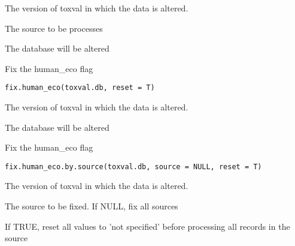 \documentclass[letterpaper]{book}
\begin{document}
%
\begin{Arguments}
\begin{ldescription}
\item[\code{toxval.db}] The version of toxval in which the data is altered.

\item[\code{source}] The source to be processes
\end{ldescription}
\end{Arguments}
%
\begin{Value}
The database will be altered
\end{Value}
%
\begin{Description}\relax
Fix the human\_eco flag
\end{Description}
%
\begin{Usage}
\begin{verbatim}
fix.human_eco(toxval.db, reset = T)
\end{verbatim}
\end{Usage}
%
\begin{Arguments}
\begin{ldescription}
\item[\code{toxval.db}] The version of toxval in which the data is altered.
\end{ldescription}
\end{Arguments}
%
\begin{Value}
The database will be altered
\end{Value}
%
\begin{Description}\relax
Fix the human\_eco flag
\end{Description}
%
\begin{Usage}
\begin{verbatim}
fix.human_eco.by.source(toxval.db, source = NULL, reset = T)
\end{verbatim}
\end{Usage}
%
\begin{Arguments}
\begin{ldescription}
\item[\code{toxval.db}] The version of toxval in which the data is altered.

\item[\code{source}] The source to be fixed. If NULL, fix all sources

\item[\code{reset}] If TRUE, reset all values to 'not specified' before processing all records in the source
\end{ldescription}
\end{Arguments}
\end{document}
